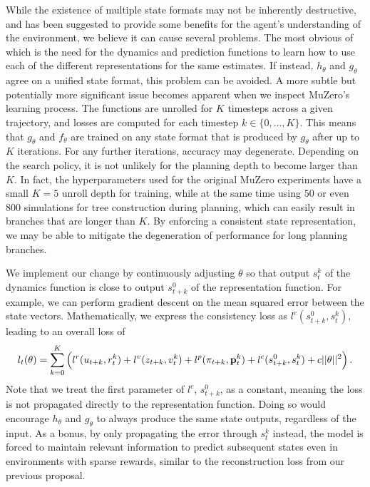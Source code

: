 While the existence of multiple state formats may not be inherently destructive, and has been suggested to provide some benefits for the agent's understanding of the environment, we believe it can cause several problems. The most obvious of which is the need for the dynamics and prediction functions to learn how to use each of the different representations for the same estimates. If instead, $h_\theta$ and $g_\theta$ agree on a unified state format, this problem can be avoided. A more subtle but potentially more significant issue becomes apparent when we inspect MuZero's learning process. The functions are unrolled for $K$ timesteps across a given trajectory, and losses are computed for each timestep $k \in \{0, ..., K\}$. This means that $g_\theta$ and $f_\theta$ are trained on any state format that is produced by $g_\theta$ after up to $K$ iterations. For any further iterations, accuracy may degenerate. Depending on the search policy, it is not unlikely for the planning depth to become larger than $K$. In fact, the hyperparameters used for the original MuZero experiments have a small $K=5$ unroll depth for training, while at the same time using $50$ or even $800$ simulations for tree construction during planning, which can easily result in branches that are longer than $K$. By enforcing a consistent state representation, we may be able to mitigate the degeneration of performance for long planning branches.

We implement our change by continuously adjusting $\theta$ so that output $s^k_t$ of the dynamics function is close to output $s^0_{t+k}$ of the representation function. For example, we can perform gradient descent on the mean squared error between the state vectors. Mathematically, we express the consistency loss as $l^c(s^0_{t+k}, s^k_t)$, leading to an overall loss of
\begin{equation*}
    l_t(\theta) = \sum^K_{k=0} \left(l^r(u_{t+k}, r_t^k) + l^v(z_{t+k}, v_t^k) + l^p(\pi_{t+k}, \text{\textbf{p}}_t^k) + l^c(s^0_{t+k}, s^k_t) + c||\theta||^2\right).
\end{equation*}
Note that we treat the first parameter of $l^c$, $s^0_{t+k}$, as a constant, meaning the loss is not propagated directly to the representation function. Doing so would encourage $h_\theta$ and $g_\theta$ to always produce the same state outputs, regardless of the input. As a bonus, by only propagating the error through $s_t^k$ instead, the model is forced to maintain relevant information to predict subsequent states even in environments with sparse rewards, similar to the reconstruction loss from our previous proposal.